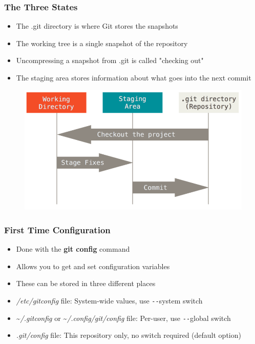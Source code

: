 \documentclass{beamer}
\begin{document}
\begin{frame}
	\frametitle{The Three States}
	\begin{itemize}
		\item{The .git directory is where Git stores the snapshots}
		\item{The working tree is a single snapshot of the repository}
		\item{Uncompressing a snapshot from .git is called "checking out"}
		\item{The staging area stores information about what goes into the next commit}
	\end{itemize}
	\begin{figure}
		\includegraphics[scale=0.25]{The_Three_States-0.png}
	\end{figure}

\end{frame}

\begin{frame}
	\frametitle{First Time Configuration}
	\begin{itemize}
		\item{Done with the \textbf{git config} command}
		\item{Allows you to get and set configuration variables}
		\item{These can be stored in three different places}
		\item{\textit{/etc/gitconfig} file: System-wide values, use \texttt{-{}-}system switch}
		\item{\textasciitilde{}\textit{/.gitconfig} or \textasciitilde{}\textit{/.config/git/config} file: Per-user, use \texttt{-{}-}global switch}
		\item{\textit{.git/config} file: This repository only, no switch required (default option)}
	\end{itemize}
\end{frame}
\end{document}
